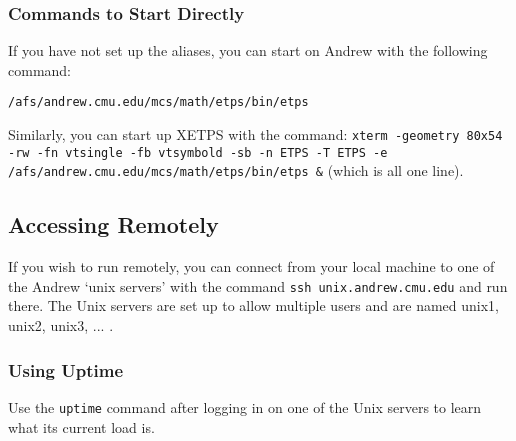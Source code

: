 \documentclass{article}
\begin{document}
\subsubsection{Commands to Start {\ETPS} Directly}

If you have not set up the aliases, you can start 
{\ETPS} on Andrew with the following command:

{\tt /afs/andrew.cmu.edu/mcs/math/etps/bin/etps}

Similarly, you can start up XETPS with the command:\newline
{\tt xterm -geometry 80x54 -rw -fn vtsingle -fb vtsymbold -sb -n ETPS -T ETPS -e \newline
/afs/andrew.cmu.edu/mcs/math/etps/bin/etps \&}\newline
(which is all one line).



\subsection{Accessing {\ETPS} Remotely}

If you wish to run {\ETPS} remotely, you can connect 
from your local machine to one of the Andrew `unix servers' 
with the command \newline
{\tt ssh unix.andrew.cmu.edu}\newline
and run {\ETPS} there. The Unix servers are set up to allow multiple
users and are named unix1, unix2, unix3, ... .

\subsubsection{Using Uptime}

Use the {\tt uptime} command after logging in
on one of the Unix servers to learn what its  current load is.

\begin{comment}
\subsubsection{An Alternative to etps.cshrc}

If you will be connecting to an Andrew workstation from another
machine, you may find
that the xset command in etps.cshrc causes confusion for the local
machine, resulting in error messages. In this case, you can source\newline
/afs/andrew.cmu.edu/mcs/math/etps/etps-no-xset.cshrc\newline
instead of\newline
/afs/andrew.cmu.edu/mcs/math/etps/etps.cshrc\newline
in your $\sim$/.cshrc file on Andrew.
In this case, your font path will not automatically contain the {\ETPS}
fonts when you do log on to an Andrew workstation, but
an alias {\tt get-etps-fonts} is defined in etps-no-xset.cshrc,
so you can simply issue the command {\tt get-etps-fonts} when you log
onto an Andrew workstation to run {\ETPS}.

\end{comment}
\end{document}
